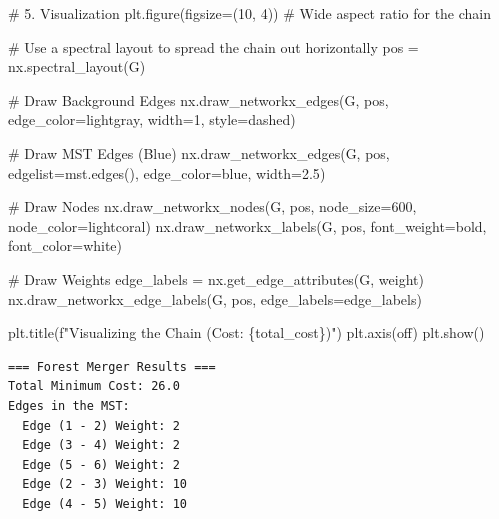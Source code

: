 \documentclass[
  letterpaper,
  DIV=11,
  numbers=noendperiod]{scrreprt}
\newenvironment{Shaded}{\begin{snugshade}}{\end{snugshade}}
\newcommand{\CommentTok}[1]{\textcolor[rgb]{0.37,0.37,0.37}{#1}}
\newcommand{\DecValTok}[1]{\textcolor[rgb]{0.68,0.00,0.00}{#1}}
\newcommand{\FloatTok}[1]{\textcolor[rgb]{0.68,0.00,0.00}{#1}}
\newcommand{\NormalTok}[1]{\textcolor[rgb]{0.00,0.23,0.31}{#1}}
\newcommand{\OperatorTok}[1]{\textcolor[rgb]{0.37,0.37,0.37}{#1}}
\newcommand{\SpecialCharTok}[1]{\textcolor[rgb]{0.37,0.37,0.37}{#1}}
\newcommand{\SpecialStringTok}[1]{\textcolor[rgb]{0.13,0.47,0.30}{#1}}
\newcommand{\StringTok}[1]{\textcolor[rgb]{0.13,0.47,0.30}{#1}}
\begin{document}
\begin{Shaded}
\begin{Highlighting}[]
\CommentTok{\# 5. Visualization}
\NormalTok{plt.figure(figsize}\OperatorTok{=}\NormalTok{(}\DecValTok{10}\NormalTok{, }\DecValTok{4}\NormalTok{)) }\CommentTok{\# Wide aspect ratio for the chain}

\CommentTok{\# Use a spectral layout to spread the chain out horizontally}
\NormalTok{pos }\OperatorTok{=}\NormalTok{ nx.spectral\_layout(G)}

\CommentTok{\# Draw Background Edges}
\NormalTok{nx.draw\_networkx\_edges(G, pos, edge\_color}\OperatorTok{=}\StringTok{\textquotesingle{}lightgray\textquotesingle{}}\NormalTok{, width}\OperatorTok{=}\DecValTok{1}\NormalTok{, style}\OperatorTok{=}\StringTok{\textquotesingle{}dashed\textquotesingle{}}\NormalTok{)}

\CommentTok{\# Draw MST Edges (Blue)}
\NormalTok{nx.draw\_networkx\_edges(G, pos, edgelist}\OperatorTok{=}\NormalTok{mst.edges(), edge\_color}\OperatorTok{=}\StringTok{\textquotesingle{}blue\textquotesingle{}}\NormalTok{, width}\OperatorTok{=}\FloatTok{2.5}\NormalTok{)}

\CommentTok{\# Draw Nodes}
\NormalTok{nx.draw\_networkx\_nodes(G, pos, node\_size}\OperatorTok{=}\DecValTok{600}\NormalTok{, node\_color}\OperatorTok{=}\StringTok{\textquotesingle{}lightcoral\textquotesingle{}}\NormalTok{)}
\NormalTok{nx.draw\_networkx\_labels(G, pos, font\_weight}\OperatorTok{=}\StringTok{\textquotesingle{}bold\textquotesingle{}}\NormalTok{, font\_color}\OperatorTok{=}\StringTok{\textquotesingle{}white\textquotesingle{}}\NormalTok{)}

\CommentTok{\# Draw Weights}
\NormalTok{edge\_labels }\OperatorTok{=}\NormalTok{ nx.get\_edge\_attributes(G, }\StringTok{\textquotesingle{}weight\textquotesingle{}}\NormalTok{)}
\NormalTok{nx.draw\_networkx\_edge\_labels(G, pos, edge\_labels}\OperatorTok{=}\NormalTok{edge\_labels)}

\NormalTok{plt.title(}\SpecialStringTok{f"Visualizing the Chain (Cost: }\SpecialCharTok{\{}\NormalTok{total\_cost}\SpecialCharTok{\}}\SpecialStringTok{)"}\NormalTok{)}
\NormalTok{plt.axis(}\StringTok{\textquotesingle{}off\textquotesingle{}}\NormalTok{)}
\NormalTok{plt.show()}
\end{Highlighting}
\end{Shaded}

\begin{verbatim}
=== Forest Merger Results ===
Total Minimum Cost: 26.0
Edges in the MST:
  Edge (1 - 2) Weight: 2
  Edge (3 - 4) Weight: 2
  Edge (5 - 6) Weight: 2
  Edge (2 - 3) Weight: 10
  Edge (4 - 5) Weight: 10
\end{verbatim}
\end{document}

